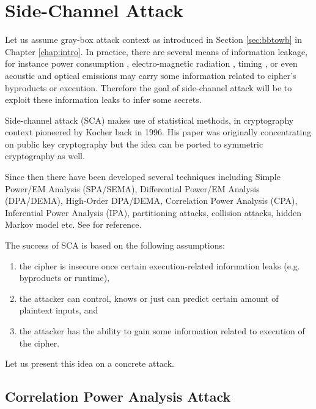 \section{Side-Channel Attack}
\label{sec:side}

Let us assume gray-box attack context as introduced in Section \ref{sec:bbtowb} in Chapter \ref{chap:intro}. In practice, there are several means of information leakage, for instance power consumption \cite{kocher1999differential}, electro-magnetic radiation \cite{agrawal2002side,gandolfi2001electromagnetic,quisquater2001electromagnetic}, timing \cite{kocher1996timing}, or even acoustic \cite{asonov2004keyboard} and optical \cite{kuhn2002optical,loughry2002information} emissions may carry some information related to cipher's byproducts or execution. Therefore the goal of side-channel attack will be to exploit these information leaks to infer some secrets.

Side-channel attack (SCA) makes use of statistical methods, in cryptography context pioneered by Kocher \cite{kocher1996timing} back in 1996. His paper was originally concentrating on public key cryptography but the idea can be ported to symmetric cryptography as well.

Since then there have been developed several techniques including Simple Power/EM Analysis (SPA/SEMA), Differential Power/EM Analysis (DPA/DEMA), High-Order DPA/DEMA, Correlation Power Analysis (CPA), Inferential Power Analysis (IPA), partitioning attacks, collision attacks, hidden Markov model etc. See \cite[Chapters~13-14]{koc2008cryptographic} for reference.

The success of SCA is based on the following assumptions:
\begin{enumerate}
	\item the cipher is insecure once certain execution-related information leaks (e.g. byproducts or runtime),
	\item the attacker can control, knows or just can predict certain amount of plaintext inputs, and
	\item the attacker has the ability to gain some information related to execution of the cipher.
\end{enumerate}
Let us present this idea on a concrete attack.

\subsection{Correlation Power Analysis Attack}

